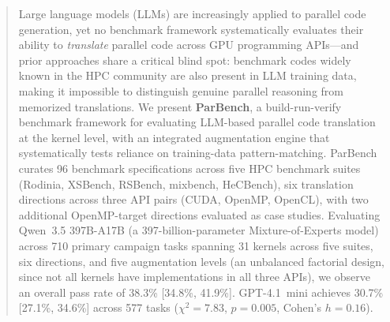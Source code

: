 \documentclass[conference]{IEEEtran}
\begin{document}
\begin{abstract}
Large language models (LLMs) are increasingly applied to parallel code generation, yet no benchmark framework systematically evaluates their ability to \emph{translate} parallel code across GPU programming APIs---and prior approaches share a critical blind spot: benchmark codes widely known in the HPC community are also present in LLM training data, making it impossible to distinguish genuine parallel reasoning from memorized translations. We present \textbf{ParBench}, a build-run-verify benchmark framework for evaluating LLM-based parallel code translation at the kernel level, with an integrated augmentation engine that systematically tests reliance on training-data pattern-matching. ParBench curates 96 benchmark specifications across five HPC benchmark suites (Rodinia, XSBench, RSBench, mixbench, HeCBench), six translation directions across three API pairs (CUDA, OpenMP, OpenCL), with two additional OpenMP-target directions evaluated as case studies. Evaluating Qwen~3.5 397B-A17B (a 397-billion-parameter Mixture-of-Experts model) across 710 primary campaign tasks spanning 31 kernels across five suites, six directions, and five augmentation levels (an unbalanced factorial design, since not all kernels have implementations in all three APIs), we observe an overall pass rate of 38.3\% [34.8\%, 41.9\%]. GPT-4.1~mini achieves 30.7\% [27.1\%, 34.6\%] across 577 tasks ($\chi^2 = 7.83$, $p = 0.005$, Cohen's $h = 0.16$). %
\end{abstract}
\end{document}
